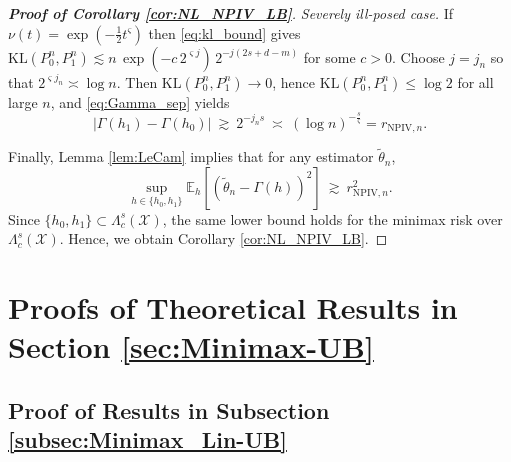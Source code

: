\documentclass[12pt,american]{article}
\theoremstyle{definition}
\theoremstyle{plain}
\theoremstyle{definition}
\theoremstyle{plain}
\theoremstyle{plain}
\theoremstyle{plain}
\theoremstyle{plain}
\theoremstyle{plain}
\newcommand{\E}{\mathbb{E}}
\newcommand{\abs}[1]{\left| #1 \right|}
\begin{document}
\begin{proof}[\textbf{Proof of Corollary \ref{cor:NL_NPIV_LB}}]
\emph{Severely ill-posed case.} If $\nu(t)=\exp(-\tfrac12 t^\varsigma)$ then \eqref{eq:kl_bound} gives
$\mathrm{KL}(P_0^n,P_1^n)\lesssim n\,\exp(-c\,2^{\varsigma j})\,2^{-j(2s+d-m)}$ for some $c>0$.
Choose $j=j_n$ so that $2^{\varsigma j_n}\asymp \log n$. Then $\mathrm{KL}(P_0^n,P_1^n)\to 0$, hence
$\mathrm{KL}(P_0^n,P_1^n)\le \log 2$ for all large $n$, and \eqref{eq:Gamma_sep} yields
\[
\abs{\Gamma(h_1)-\Gamma(h_0)}\ \gtrsim\ 2^{-j_n s}\ \asymp\ (\log n)^{-\frac{s}{\varsigma}}
=r_{\mathrm{NPIV},n}.
\]

Finally, Lemma \ref{lem:LeCam} implies that for any estimator $\tilde\theta_n$,
\[
\sup_{h\in\{h_0,h_1\}}
\E_h\!\left[(\tilde\theta_n-\Gamma(h))^2\right]
\ \gtrsim\ r_{\mathrm{NPIV},n}^2.
\]
Since $\{h_0,h_1\}\subset\Lambda_c^s(\mathcal{X})$, the same lower bound holds for the minimax risk over $\Lambda_c^s(\mathcal{X})$.
Hence, we obtain Corollary \ref{cor:NL_NPIV_LB}.

\end{proof}

\section{\label{sec:MainProofs-UB}Proofs of Theoretical Results in Section \ref{sec:Minimax-UB}}

\subsection{Proof of Results in Subsection \ref{subsec:Minimax_Lin-UB}}
\end{document}
